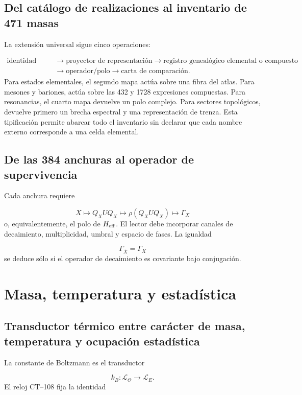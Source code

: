 \subsection{Del catálogo de realizaciones al inventario de 471 masas}
La extensión universal sigue cinco operaciones:

\[
\begin{aligned}
 \text{identidad física}
 &\longrightarrow
 \text{proyector de representación}
 \longrightarrow
 \text{registro genealógico elemental o compuesto}\\
 &\longrightarrow
 \text{operador/polo}
 \longrightarrow
 \text{carta de comparación}.
\end{aligned}
\]
Para estados elementales, el segundo mapa actúa sobre una fibra del atlas. Para mesones y bariones, actúa sobre las 432 y 1728 expresiones compuestas. Para resonancias, el cuarto mapa devuelve un polo complejo. Para sectores topológicos, devuelve primero un brecha espectral y una representación de trenza. Esta tipificación permite abarcar todo el inventario sin declarar que cada nombre externo corresponde a una celda elemental.

\subsection{De las 384 anchuras al operador de supervivencia}
Cada anchura requiere

\[
 X\longmapsto Q_XUQ_X
 \longmapsto \rho(Q_XUQ_X)
 \longmapsto\Gamma_X
\]
o, equivalentemente, el polo de \(H_{\rm eff}\). El lector debe incorporar canales de decaimiento, multiplicidad, umbral y espacio de fases. La igualdad

\[
 \Gamma_{\bar X}=\Gamma_X
\]
se deduce sólo si el operador de decaimiento es covariante bajo conjugación.

\section{Masa, temperatura y estadística}
\subsection{Transductor térmico entre carácter de masa, temperatura y ocupación estadística}
La constante de Boltzmann es el transductor

\[
 k_B:\mathcal L_\Theta\longrightarrow\mathcal L_E.
\]
El reloj CT--108 fija la identidad

